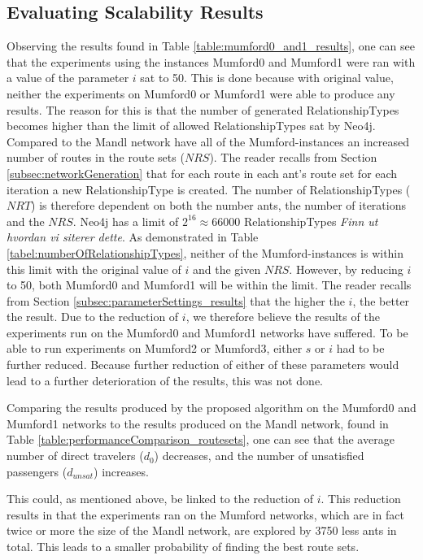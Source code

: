 \subsection{Evaluating Scalability Results}

Observing the results found in Table \vref{table:mumford0_and1_results}, one can see that the experiments using the  instances Mumford0 and Mumford1 were ran with a value of the parameter $i$ sat to 50. This is done because with original value, neither the experiments on Mumford0 or Mumford1 were able to produce any results. The reason for this is that the number of generated RelationshipTypes becomes higher than the limit of allowed RelationshipTypes sat by Neo4j. Compared to the Mandl network have all of the Mumford-instances an increased number of routes in the route sets ($NRS$). The reader recalls from Section \vref{subsec:networkGeneration} that for each route in each ant's route set for each iteration a new RelationshipType is created. The number of RelationshipTypes ($NRT$) is therefore dependent on both the number ants, the number of iterations and the $NRS$. Neo4j has a limit of $2^{16} \approx 66 000$ RelationshipTypes \emph{\color{blue} Finn ut hvordan vi siterer dette}. As demonstrated in Table \vref{tabel:numberOfRelationshipTypes}, neither of the Mumford-instances is within this limit with the original value of $i$ and the given $NRS$. However, by reducing $i$ to 50, both Mumford0 and Mumford1 will be within the limit. The reader recalls from Section \vref{subsec:parameterSettings_results} that the higher the $i$, the better the result. Due to the reduction of $i$, we therefore believe the results of the experiments run on the Mumford0 and Mumford1 networks have suffered. To be able to run experiments on Mumford2 or Mumford3, either $s$ or $i$ had to be further reduced. Because further reduction of either of these parameters would lead to a further deterioration of the results, this was not done.

Comparing the results produced by the proposed algorithm on the Mumford0 and Mumford1 networks to the results produced on the Mandl network, found in Table \vref{table:performanceComparison_routesets}, one can see that the average number of direct travelers ($d_0$) decreases, and the number of unsatisfied passengers ($d_{unsat}$) increases. 

This could, as mentioned above, be linked to the reduction of $i$. This reduction results in that the experiments ran on the Mumford networks, which are in fact twice or more the size of the Mandl network, are explored by 3750 less ants in total. This leads to a smaller probability of finding the best route sets.


